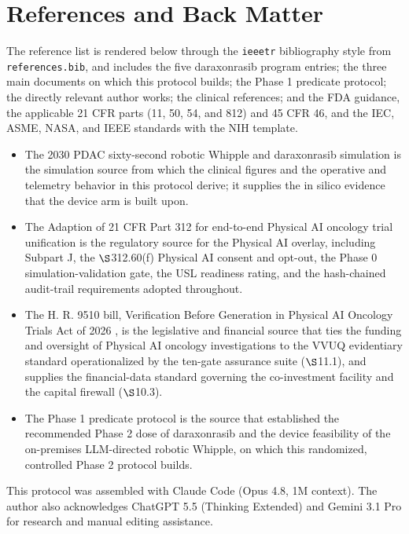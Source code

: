 \section{References and Back Matter}

The reference list is rendered below through the \texttt{ieeetr} bibliography style
from \texttt{references.bib}, and includes the five daraxonrasib program entries; the
three main documents on which this protocol builds; the Phase 1 predicate protocol;
the directly relevant author works; the clinical references; and the FDA guidance,
the applicable 21 CFR parts (11, 50, 54, and 812) and 45 CFR 46, and the IEC, ASME,
NASA, and IEEE standards with the NIH template.

\begin{itemize}[leftmargin=1.6em,itemsep=3pt,topsep=2pt]
\item The 2030 PDAC sixty-second robotic Whipple and daraxonrasib simulation
\cite{kawchak_2026_20196639} is the simulation source from which the clinical
figures and the operative and telemetry behavior in this protocol derive; it
supplies the in silico evidence that the device arm is built upon.
\item The Adaption of 21 CFR Part 312 for end-to-end Physical AI oncology trial
unification \cite{kawchak2026adapt312} is the regulatory source for the Physical AI
overlay, including Subpart J, the $\S$312.60(f) Physical AI consent and opt-out, the
Phase 0 simulation-validation gate, the USL readiness rating, and the hash-chained
audit-trail requirements adopted throughout.
\item The H. R. 9510 bill, Verification Before Generation in Physical AI Oncology
Trials Act of 2026 \cite{kawchak2026hr9510}, is the legislative and financial source
that ties the funding and oversight of Physical AI oncology investigations to the
VVUQ evidentiary standard operationalized by the ten-gate assurance suite
($\S$11.1), and supplies the financial-data standard governing the co-investment
facility and the capital firewall ($\S$10.3).
\item The Phase 1 predicate protocol \cite{kawchak2026phase1} is the source that
established the recommended Phase 2 dose of daraxonrasib and the device feasibility
of the on-premises LLM-directed robotic Whipple, on which this randomized,
controlled Phase 2 protocol builds.
\end{itemize}

This protocol was assembled with Claude Code (Opus 4.8, 1M context). The author also
acknowledges ChatGPT 5.5 (Thinking Extended) and Gemini 3.1 Pro for research and manual editing assistance.

